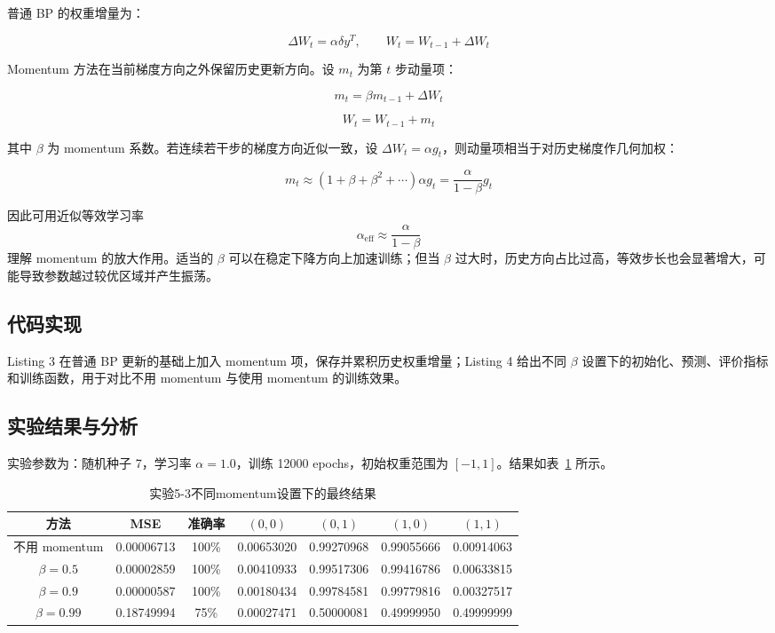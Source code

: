 \documentclass[10.5pt]{config}
\begin{document}
普通 BP 的权重增量为：

\[
\Delta W_t=\alpha \delta y^T,\qquad W_t=W_{t-1}+\Delta W_t
\]

Momentum 方法在当前梯度方向之外保留历史更新方向。设 $m_t$ 为第 $t$ 步动量项：

\[
m_t=\beta m_{t-1}+\Delta W_t
\]

\[
W_t=W_{t-1}+m_t
\]

其中 $\beta$ 为 momentum 系数。若连续若干步的梯度方向近似一致，设 $\Delta W_t=\alpha g_t$，则动量项相当于对历史梯度作几何加权：

\[
m_t\approx \left(1+\beta+\beta^2+\cdots\right)\alpha g_t
=\frac{\alpha}{1-\beta}g_t
\]

因此可用近似等效学习率
\[
\alpha_{\mathrm{eff}}\approx\frac{\alpha}{1-\beta}
\]
理解 momentum 的放大作用。适当的 $\beta$ 可以在稳定下降方向上加速训练；但当 $\beta$ 过大时，历史方向占比过高，等效步长也会显著增大，可能导致参数越过较优区域并产生振荡。

\subsection{代码实现}

Listing 3 在普通 BP 更新的基础上加入 momentum 项，保存并累积历史权重增量；Listing 4 给出不同 $\beta$ 设置下的初始化、预测、评价指标和训练函数，用于对比不用 momentum 与使用 momentum 的训练效果。
\clearpage



\clearpage



\subsection{实验结果与分析}

实验参数为：随机种子 7，学习率 $\alpha=1.0$，训练 12000 epochs，初始权重范围为 $[-1,1]$。结果如表~\ref{tab:exp53_results} 所示。

\begin{table}[H]
\centering
\scriptsize
\begin{tabular}{ccccccc}
\toprule
方法 & MSE & 准确率 & $(0,0)$ & $(0,1)$ & $(1,0)$ & $(1,1)$ \\
\midrule
不用 momentum & 0.00006713 & 100\% & 0.00653020 & 0.99270968 & 0.99055666 & 0.00914063 \\
$\beta=0.5$ & 0.00002859 & 100\% & 0.00410933 & 0.99517306 & 0.99416786 & 0.00633815 \\
$\beta=0.9$ & 0.00000587 & 100\% & 0.00180434 & 0.99784581 & 0.99779816 & 0.00327517 \\
$\beta=0.99$ & 0.18749994 & 75\% & 0.00027471 & 0.50000081 & 0.49999950 & 0.49999999 \\
\bottomrule
\end{tabular}
\caption{实验5-3不同momentum设置下的最终结果}
\label{tab:exp53_results}
\end{table}
\end{document}
